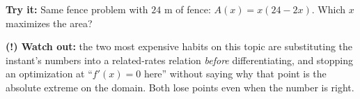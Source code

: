 \documentclass[12pt]{article}
\begin{document}
\begin{tryitbox}
\textbf{Try it:} \quad Same fence problem with $24$ m of fence:
$A(x) = x(24 - 2x)$. Which $x$ maximizes the area?\\[2pt]
\end{tryitbox}

\begin{watchoutbox}
\textbf{(!) Watch out:} the two most expensive habits on this topic are
substituting the instant's numbers into a related-rates relation \emph{before}
differentiating, and stopping an optimization at ``$f'(x) = 0$ here'' without
saying why that point is the absolute extreme on the domain. Both lose points
even when the number is right.
\end{watchoutbox}
\end{document}
